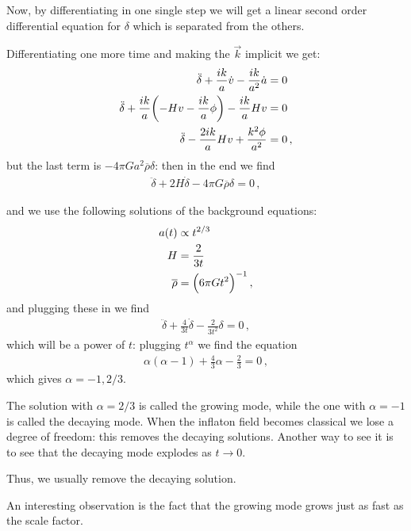 \documentclass[main.tex]{subfiles}
\begin{document}
Now, by differentiating in one single step we will get a linear second order differential equation for \(\delta \) which is separated from the others. 

Differentiating one more time and making the \(\vec{k}\) implicit we get: 
%
\begin{subequations}
\begin{align}
  \ddot{\delta} + \frac{ik}{a} \dot{v} - \frac{ik}{a^2}\dot{a} &= 0  \\
  \ddot{\delta} + \frac{ik}{a} \qty(-Hv - \frac{ik}{a} \phi ) - \frac{ik}{a} Hv &=0  \\
  \ddot{\delta} - \frac{2ik}{a} Hv + \frac{k^2 \phi }{a^2} &=0
\,,
\end{align}
\end{subequations}
%
but the last term is \(- 4 \pi G a^2 \overline{\rho} \delta \): then in the end we find 
%
\begin{align}
  \ddot{\delta} + 2 H \dot{\delta} - 4 \pi G \overline{\rho} \delta = 0 
\,,
\end{align}
%

and we use the following solutions of the background equations: 
%
\begin{subequations}
\begin{align}
  a(t ) &\propto t^{2/3}  \\
  H &= \frac{2}{3t}  \\
\overline{\rho} &= \qty(6 \pi G t^2)^{-1}
\,,
\end{align}
\end{subequations}
%
and plugging these in we find 
%
\begin{align}
  \ddot{\delta} + \frac{4}{3t} \dot{\delta} - \frac{2}{3t^2} \delta = 0
\,,
\end{align}
%
which will be a power of \(t\): plugging \(t^{\alpha }\) we find the equation 
%
\begin{align}
  \alpha (\alpha -1) + \frac{4}{3} \alpha - \frac{2}{3} =0 
\,,
\end{align}
%
which gives \(\alpha = -1, 2/3\). 

The solution with \(\alpha = 2/3\) is called the growing mode, while the one with \(\alpha = -1\) is called the decaying mode. 
When the inflaton field becomes classical we lose a degree of freedom: this removes the decaying solutions. 
Another way to see it is to see that the decaying mode explodes as \(t \rightarrow 0\). 

Thus, we usually remove the decaying solution. 

An interesting observation is the fact that the growing mode grows just as fast as the scale factor. 
\end{document}
